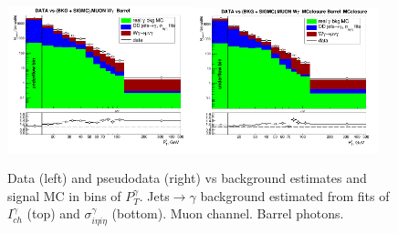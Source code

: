 \begin{figure}[htb]
\begin{center}
   \includegraphics[width=0.48\textwidth]{../figs/figs_v11/MUON_WGamma/PrepareYields/c_DATAvsBkgPlusSigMCc_MUON_WGamma_TEMPL_SIHIH_UNblind__Barrel__phoEt.png}\includegraphics[width=0.48\textwidth]{../figs/figs_v11/MUON_WGamma/PrepareYields/c_DATAvsBkgPlusSigMCc_MUON_WGamma_TEMPL_SIHIH_UNblind_MCclosure__Barrel__phoEt_MCclosure.png}
  \caption{Data (left) and pseudodata (right) vs background estimates and signal MC in bins of $P_T^{\gamma}$. Jets$\rightarrow\gamma$ background estimated from fits of $I_{ch}^{\gamma}$ (top) and  $\sigma_{i\eta i\eta}^{\gamma}$ (bottom). Muon channel. Barrel photons.}
  \label{fig:DATAvsBKGandSIGMC_MCclosure_MUON_B}
  \end{center}
\end{figure}

